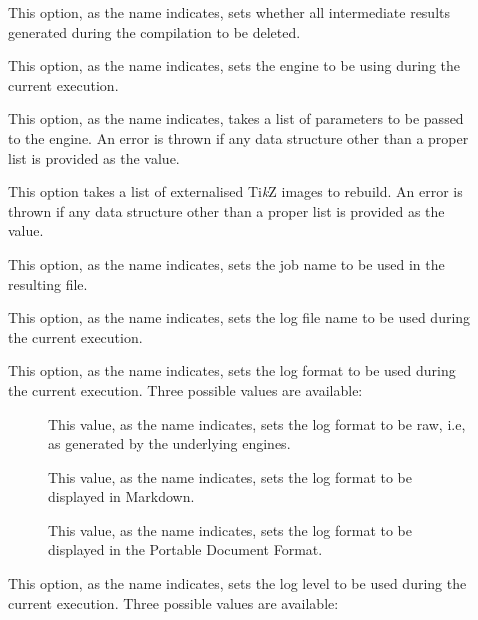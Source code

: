 \begin{description}
\begin{description}
\item[] This option, as the name indicates, sets whether all intermediate results generated during the compilation to be deleted.

\item[] This option, as the name indicates, sets the engine to be using during the current execution.

\item[] This option, as the name indicates, takes a list of parameters to be passed to the engine. An error is thrown if any data structure other than a proper list is provided as the value.

\item[] This option takes a list of externalised Ti\textit{k}Z images to rebuild. An error is thrown if any data structure other than a proper list is provided as the value.

\item[] This option, as the name indicates, sets the job name to be used in the resulting file.

\item[] This option, as the name indicates, sets the log file name to be used during the current execution.

\item[] This option, as the name indicates, sets the log format to be used during the current execution. Three possible values are available:

\begin{description}
\item[] This value, as the name indicates, sets the log format to be raw, i.e, as generated by the underlying engines.

\item[] This value, as the name indicates, sets the log format to be displayed in Markdown.

\item[] This value, as the name indicates, sets the log format to be displayed in the Portable Document Format.
\end{description}

\item[] This option, as the name indicates, sets the log level to be used during the current execution. Three possible values are available:


\end{description}
\end{description}
